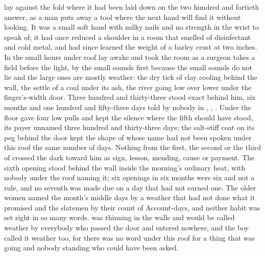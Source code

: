 
 lay against the fold where it had been laid down on the two hundred and fortieth answer, as a man puts away a tool where the next hand will find it without looking. It was a small soft hand with milky nails and no strength in the wrist to speak of; it had once reduced a shoulder in a room that smelled of disinfectant and cold metal, and had since learned the weight of a barley crust at two inches. In the small hours under  roof  lay awake and took the room as a surgeon takes a field before the light, by the small sounds first because the small sounds do not lie and the large ones are mostly weather: the dry tick of clay cooling behind the wall, the settle of a coal under its ash, the river going low over lower under the finger's-width door. Three hundred and thirty-three stood exact behind him, six months and one hundred and fifty-three days told by nobody in , , . Under the floor  gave four low pulls and kept the silence where the fifth should have stood, its payer unnamed three hundred and thirty-three days; the salt-stiff coat on its peg behind the door kept the shape of  whose name had not been spoken under this roof the same number of days. Nothing from the first, the second or the third of  crossed the dark toward him as sign, lesson, mending, cause or payment. The sixth opening stood behind the wall inside the morning's ordinary heat, with nobody under the roof naming it; six openings in six months were six and not a rule, and no seventh was made due on a day that had not earned one. The older women named the month's middle days by a weather that had not done what it promised and the slatemen by their count of Account-days, and neither habit was set right in so many words.  was thinning in the walls and would be called weather by everybody who passed the door and entered nowhere, and the boy called it weather too, for there was no word under this roof for a thing that was going and nobody standing who could have been asked.

